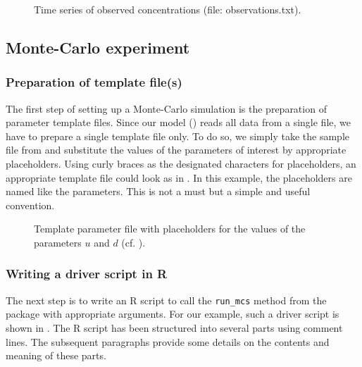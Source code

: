 \begin{figure}
  
  \caption{Time series of observed concentrations (file: observations.txt). \label{fig:mops:example_mcs:adModel_observations}}
\end{figure}

\subsection{Monte-Carlo experiment} \label{sec:mops:example_mcs:experiment}

\subsubsection*{Preparation of template file(s)}
The first step of setting up a Monte-Carlo simulation is the preparation of parameter template files. Since our model () reads all data from a single file, we have to prepare a single template file only. To do so, we simply take the sample file from  and substitute the values of the parameters of interest by appropriate placeholders. Using curly braces as the designated characters for placeholders, an appropriate template file could look as in . In this example, the placeholders are named like the parameters. This is not a must but a simple and useful convention.

\begin{figure}
  
  \caption{Template parameter file with placeholders for the values of the parameters $u$ and $d$ (cf. ). \label{fig:mops:example_mcs:adModel_inputTemplate}}
\end{figure}

\subsubsection*{Writing a driver script in R}
The next step is to write an R script to call the \texttt{run\_mcs} method from the  package with appropriate arguments. For our example, such a driver script is shown in . The R script has been structured into several parts using comment lines. The subsequent paragraphs provide some details on the contents and meaning of these parts.


